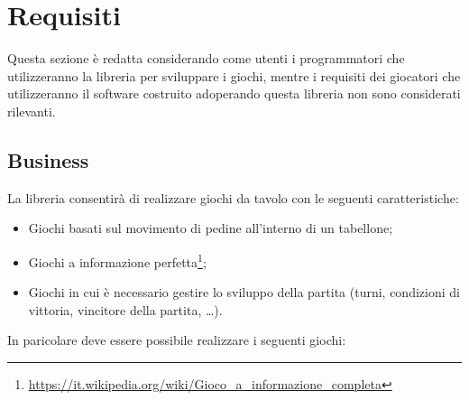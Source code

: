 \section{Requisiti}

Questa sezione è redatta considerando come utenti i programmatori che utilizzeranno la libreria per sviluppare i giochi, mentre i requisiti dei giocatori che utilizzeranno il software costruito adoperando questa libreria non sono considerati rilevanti.

\subsection{Business}

La libreria consentirà di realizzare giochi da tavolo con le seguenti caratteristiche:

\begin{itemize}
    \item Giochi basati sul movimento di pedine all'interno di un tabellone;
    \item Giochi a informazione perfetta\footnote{\url{https://it.wikipedia.org/wiki/Gioco_a_informazione_completa}};
    \item Giochi in cui è necessario gestire lo sviluppo della partita (turni, condizioni di vittoria, vincitore della partita, \dots).
\end{itemize}

In paricolare deve essere possibile realizzare i seguenti giochi:

